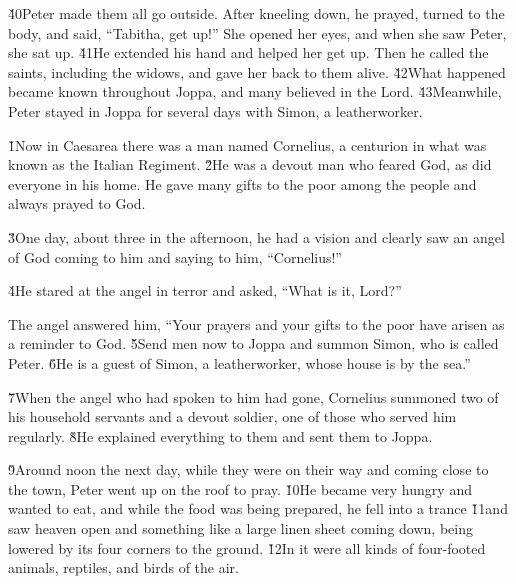 \v{40}Peter made them all go outside. After kneeling down, he prayed, turned to the body, and said, ``Tabitha, get up!'' She opened her eyes, and when she saw Peter, she sat up. \v{41}He extended his hand and helped her get up. Then he called the saints, including the widows, and gave her back to them alive. \v{42}What happened became known throughout Joppa, and many believed in the Lord. \v{43}Meanwhile, Peter stayed in Joppa for several days with Simon, a leatherworker.

\v{1}Now in Caesarea there was a man named Cornelius, a centurion in what was known as the Italian Regiment. \v{2}He was a devout man who feared God, as did everyone in his home. He gave many gifts to the poor among the people and always prayed to God.

\v{3}One day, about three in the afternoon, he had a vision and clearly saw an angel of God coming to him and saying to him, ``Cornelius!''

\v{4}He stared at the angel in terror and asked, ``What is it, Lord?''

The angel answered him, ``Your prayers and your gifts to the poor have arisen as a reminder to God. \v{5}Send men now to Joppa and summon Simon, who is called Peter. \v{6}He is a guest of Simon, a leatherworker, whose house is by the sea.''

\v{7}When the angel who had spoken to him had gone, Cornelius summoned two of his household servants and a devout soldier, one of those who served him regularly. \v{8}He explained everything to them and sent them to Joppa.

\v{9}Around noon the next day, while they were on their way and coming close to the town, Peter went up on the roof to pray. \v{10}He became very hungry and wanted to eat, and while the food was being prepared, he fell into a trance \v{11}and saw heaven open and something like a large linen sheet coming down, being lowered by its four corners to the ground. \v{12}In it were all kinds of four-footed animals, reptiles, and birds of the air.

